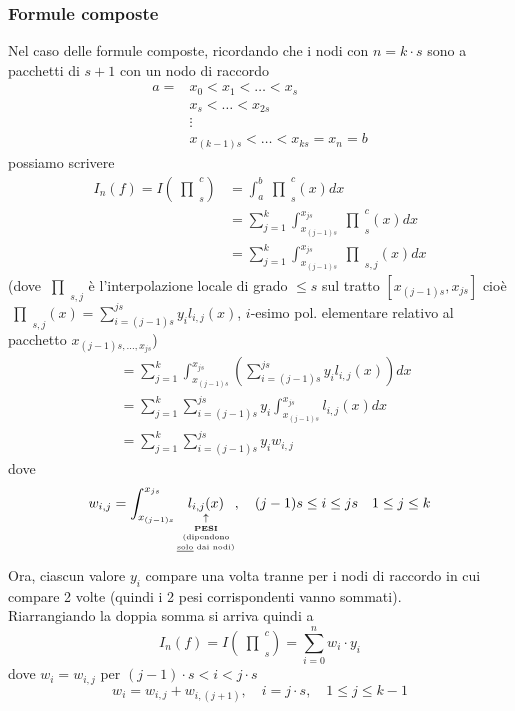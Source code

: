 \documentclass[12pt,a4paper]{article}
\newcommand{\inter}{\begin{matrix}\prod\end{matrix}}
\begin{document}
\subsubsection{Formule composte}
Nel caso delle formule composte, ricordando che i nodi con $n=k\cdot s$ sono a pacchetti di $s+1$ con un nodo di raccordo
\begin{equation*}
    \begin{split}
        a = & x_0 < x_1 < \dotso < x_s \\
        & x_s < \dotso < x_ {2s} \\
        & \vdots \\
        & x_{(k-1)s} < \dotso < x_{ks} = x_n = b
    \end{split}
\end{equation*}
possiamo scrivere
\begin{equation*}
    \begin{split}
        I_n(f) = I(\inter_s^c) & = \int_a^b \inter_s^c(x) dx \\
        & = \sum_{j=1}^k \int_{x_{(j-1)s}}^{x_{js}} \inter_s^c(x) dx \\
        & = \sum_{j=1}^k \int_{x_{(j-1)s}}^{x_{js}} \inter_{s,j}(x) dx
    \end{split}
\end{equation*}
(dove $\inter_{s,j}$ è l'interpolazione locale di grado $\leq s$ sul tratto $[x_{(j-1)s},x_{js}]$ cioè $\inter_{s,j}(x)=\sum_{i=(j-1)s}^{js} y_i l_{i,j} (x)$, $i$-esimo pol. elementare relativo al pacchetto $x_{(j-1)s, \dotso , x_{js}}$)
\begin{equation*}
    \begin{split}
        & = \sum_{j=1}^k \int_{x_{(j-1)s}}^{x_{js}} \left(\sum_{i=(j-1)s}^{js} y_i l_{i,j}(x) \right) dx \\ 
        & = \sum_{j=1}^k \sum_{i=(j-1)s}^{js} y_i \int_{x_{(j-1)s}}^{x_{js}} l_{i,j}(x)dx \\
        & = \sum_{j=1}^k \sum_{i=(j-1)s}^{js} y_i w_{i,j}
    \end{split}
\end{equation*}
dove 
\[w_{i,j} = \int_{x_{(j-1)s}}^{x_{js}} \underset{\underset{\underset{\underset{\text{\uline{solo} dai nodi)}}{\text{(dipendono}}}{\textbf{PESI}}}{\uparrow}}{l_{i,j}(x)} , \quad (j-1)s \leq i \leq js \quad  1 \leq j \leq k\]
Ora, ciascun valore $y_i$ compare una volta tranne per i nodi di raccordo in cui compare 2 volte (quindi i 2 pesi corrispondenti vanno sommati).\\
Riarrangiando la doppia somma si arriva quindi a
\[
I_n (f) = I(\inter_s^c) = \sum_{i=0}^n w_i \cdot y_i
\]
dove $w_i = w_{i,j}$ per $(j-1) \cdot s < i < j \cdot s$
\[
w_i = w_{i,j} + w_{i,(j+1)}, \quad i=j \cdot s, \quad 1 \leq j \leq k-1
\]
\end{document}
